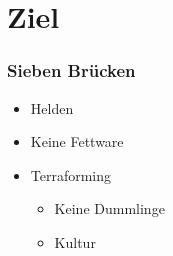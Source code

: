 \section{Ziel}
%
\begin{frame}
	\frametitle{Sieben Brücken}
	\begin{itemize}
		\item Helden
		\item Keine Fettware
		\item Terraforming
		\begin{itemize}
			\item Keine Dummlinge
			\item Kultur
		\end{itemize}
	\end{itemize}
\end{frame}

